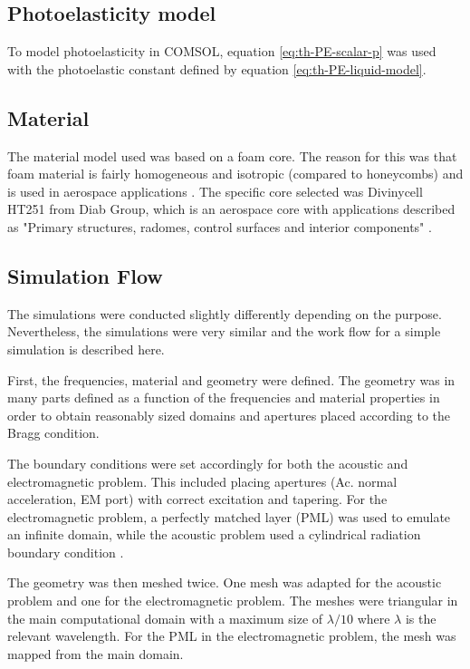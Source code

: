 \documentclass[11pt,twoside]{eitExjobb}
\begin{document}
	\subsection{Photoelasticity model}
	To model photoelasticity in COMSOL, equation \eqref{eq:th-PE-scalar-p} was used with the photoelastic constant defined by equation \eqref{eq:th-PE-liquid-model}.
	
	\subsection{Material}
	The material model used was based on a foam core. The reason for this was that foam material is fairly homogeneous and isotropic (compared to honeycombs) and is used in aerospace applications \addref. The specific core selected was Divinycell HT251 from Diab Group, which is an aerospace core with applications described as "Primary structures, radomes, control surfaces and interior components" \cite{Diab2016}.
	
	\subsection{Simulation Flow}
	The simulations were conducted slightly differently depending on the purpose. Nevertheless, the simulations were very similar and the work flow for a simple simulation is described here.
	
	First, the frequencies, material and geometry were defined. The geometry was in many parts defined as a function of the frequencies and material properties in order to obtain reasonably sized domains and apertures placed according to the Bragg condition.
	
	The boundary conditions were set accordingly for both the acoustic and electromagnetic problem. This included placing apertures (Ac. normal acceleration, EM port) with correct excitation and tapering. For the electromagnetic problem, a perfectly matched layer (PML) was used to emulate an infinite domain, while the acoustic problem used a cylindrical radiation boundary condition .
	
	The geometry was then meshed twice. One mesh was adapted for the acoustic problem and one for the electromagnetic problem. The meshes were triangular in the main computational domain with a maximum size of $\lambda/10$ where $\lambda$ is the relevant wavelength. For the PML in the electromagnetic problem, the mesh was mapped from the main domain.
	
\end{document}
